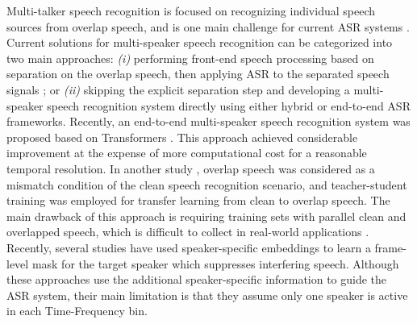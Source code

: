 \documentclass{article}
\begin{document}
Multi-talker speech recognition is focused on recognizing individual speech sources from overlap speech, and is one main challenge for current ASR systems \cite{chang2020end,watanabe2020chime,yousefi21_interspeech, yousefi2018assessing,barker2018fifth,qian2018past,mirsamadi2019multi,yousefi2020block}. 
Current solutions for multi-speaker speech recognition  can be categorized into two main approaches: \emph{(i)} performing front-end speech processing based on separation on the overlap speech, then applying ASR to the separated speech signals \cite{boeddeker2018front,yousefi2016supervised,yousefi2020frame,deng2011front, narayanan2014investigation,mirsamadi2014multichannel, yousefi2019probabilistic}; or \emph{(ii)} skipping the explicit separation step and developing a multi-speaker speech recognition system directly using either hybrid \cite{kanda2019acoustic,weng2015deep,kanda2019simultaneous} or end-to-end \cite{seki2018purely,lu2021streaming} ASR frameworks. Recently, an end-to-end multi-speaker speech recognition system was proposed based on Transformers \cite{chang2020end}. This approach achieved considerable improvement at the expense of more computational cost for a reasonable temporal resolution. In another study \cite{chen2017progressive}, overlap speech was considered as a mismatch condition of the clean speech recognition scenario, and teacher-student training was employed for transfer learning from clean to overlap speech. The main drawback of this approach is requiring training sets with parallel clean and overlapped speech, which is difficult to collect in real-world applications \cite{denisov2019end}.
Recently, several studies \cite{kanda2019acoustic,wang2019end,subramanian2020far} have used speaker-specific embeddings to learn a frame-level mask for the target speaker which suppresses interfering speech. Although these approaches use the additional speaker-specific information to guide the ASR system, their main limitation is that they assume only one speaker is active in each Time-Frequency bin. 
\end{document}
